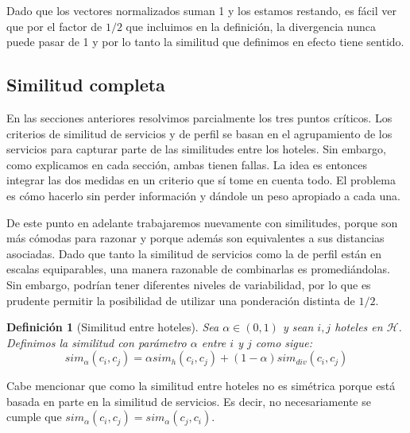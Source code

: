 \documentclass[12pt]{report}
\newcommand{\HH}{\mathcal{H}}
\newtheorem{defn}{Definici\'on}[chapter]
\begin{document}
Dado que los vectores normalizados suman 1 y los estamos restando, es fácil ver que por el factor de $1/2$ que incluimos en la definición, la divergencia nunca puede pasar de 1 y por lo tanto la similitud que definimos en efecto tiene sentido.

\subsection*{Similitud completa}

En las secciones anteriores resolvimos parcialmente los tres puntos críticos. Los criterios de similitud de servicios y de perfil se basan en el agrupamiento de los servicios para capturar parte de las similitudes entre los hoteles. Sin embargo, como explicamos en cada sección, ambas tienen fallas. La idea es entonces integrar las dos medidas en un criterio que sí tome en cuenta todo. El problema es cómo hacerlo sin perder información y dándole un peso apropiado a cada una.

De este punto en adelante trabajaremos nuevamente con similitudes, porque son más cómodas para razonar y porque además son equivalentes a sus distancias asociadas. Dado que tanto la similitud de servicios como la de perfil están en escalas equiparables, una manera razonable de combinarlas es promediándolas. Sin embargo, podrían tener diferentes niveles de variabilidad, por lo que es prudente permitir la posibilidad de utilizar una ponderación distinta de $1/2$.
\begin{defn}[Similitud entre hoteles]
Sea $\alpha \in (0,1)$ y sean $i, j$ hoteles en $\HH$. Definimos la similitud con parámetro $\alpha$ entre $i$ y $j$ como sigue:
\[
sim_\alpha(c_i, c_j) = \alpha sim_h(c_i, c_j) + (1 - \alpha) sim_{div}(c_i, c_j)
\]
\end{defn}
Cabe mencionar que como la similitud entre hoteles no es simétrica porque está basada en parte en la similitud de servicios. Es decir, no necesariamente se cumple que $sim_\alpha(c_i, c_j) = sim_\alpha(c_j, c_i)$.
\end{document}
